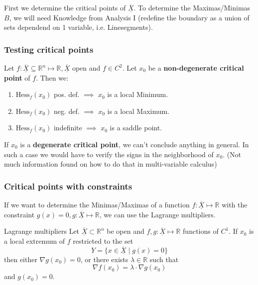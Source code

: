 \documentclass[a4paper,fontsize = 8pt]{scrartcl}
\def\R{\mathbb{R}}
\def\X{\underline{\overline{X}}}
\begin{document}
First we determine the critical points of \(\X\). To determine the Maximas/Minimas \(B\), we will need Knowledge from Analysis I (redefine the boundary as a union of sets dependend on 1 variable, i.e. Linesegments).
\subsubsection*{Testing critical points}
Let \(f: \X \subseteq \R^n \mapsto \R, \X\) open and \(f\in C^2\). Let \(x_0\) be a \textbf{non-degenerate critical point} of \(f\). Then we:
\begin{enumerate}
  \item $\text{Hess}_f(x_0)$ pos. def. \(\implies\) $x_0$ is a local Minimum.
  \item $\text{Hess}_f(x_0)$ neg. def. \(\implies\) $x_0$ is a local Maximum.
  \item $\text{Hess}_f(x_0)$ indefinite \(\implies\) $x_0$ is a saddle point.
\end{enumerate}
If \(x_0\) is a \textbf{degenerate critical point}, we can't conclude anything in general. In such a case we would have to verify the signs in the neighborhood of $x_0$. (Not much information found on how to do that in multi-variable calculus)
\subsubsection*{Critical points with constraints}
If we want to determine the Minimas/Maximas of a function \(f: \X \mapsto \R\) with the constraint \(g(x) = 0, g: \X \mapsto \R\), we can use the Lagrange multipliers.
\begin{subbox}{Lagrange multipliers}
  Let \(\X \subset \R^n\) be open and \(f,g: \X \mapsto \R\) functions of \(C^1\). If $x_0$ is a local extremum of $f$ restricted to the set \[Y = \{x \in \X \mid g(x) = 0\}\] then either $\nabla g(x_0) = 0$, or there exists $\lambda \in \R$ such that 
     \[\nabla f(x_0) = \lambda \cdot \nabla g(x_0)\] and \(g(x_0) = 0\).
\end{subbox}
\end{document}
